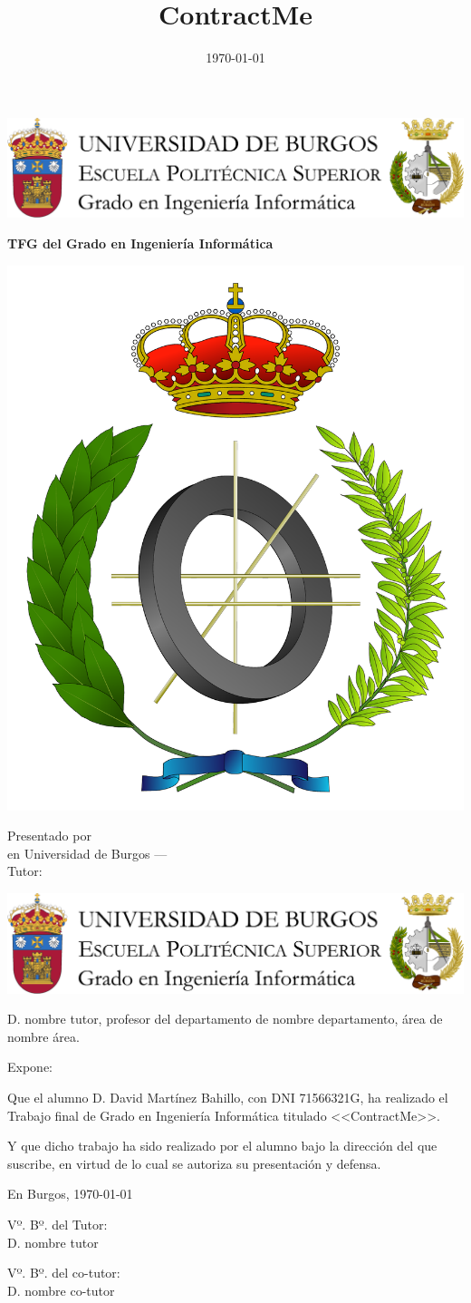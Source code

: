 \documentclass[a4paper,12pt,twoside]{memoir}
\title{ContractMe}
\author{\nombre}
\date{\today}
\makeatletter
\def\maketitle{
  \null
  \thispagestyle{empty}
\noindent\includegraphics[width=\textwidth]{cabecera}\vspace{1cm}%
  \vfill
  \colorbox{cpardoBox}{%
    \begin{minipage}{.8\textwidth}
      \vspace{.5cm}\Large
      \begin{center}
      \textbf{TFG del Grado en Ingeniería Informática}\vspace{.6cm}\\
      \textbf{\LARGE\@title{}}
      \end{center}
      \vspace{.2cm}
    \end{minipage}

  }%
  \hfill\begin{minipage}{.20\textwidth}
    \includegraphics[width=\textwidth]{escudoInfor}
  \end{minipage}
  \vfill
  \begin{center}%
  {%
    \noindent\LARGE
    Presentado por \@author{}\\ 
    en Universidad de Burgos --- \@date{}\\
    Tutor: \@tutor{}\\
  }%
  \end{center}%
  \null
  \cleardoublepage
  }
\newcommand{\nombre}{David Martínez Bahillo} %
\makeatother
\begin{document}
\maketitle


\newpage\null\thispagestyle{empty}\newpage


\thispagestyle{empty}


\noindent\includegraphics[width=\textwidth]{cabecera}\vspace{1cm}

\noindent D. nombre tutor, profesor del departamento de nombre departamento, área de nombre área.

\noindent Expone:

\noindent Que el alumno D. \nombre, con DNI 71566321G, ha realizado el Trabajo final de Grado en Ingeniería Informática titulado <<ContractMe>>. 

\noindent Y que dicho trabajo ha sido realizado por el alumno bajo la dirección del que suscribe, en virtud de lo cual se autoriza su presentación y defensa.

\begin{center} %
En Burgos, {\large \today}
\end{center}

\vfill\vfill\vfill

\begin{minipage}{0.45\textwidth}
\begin{flushleft} %
Vº. Bº. del Tutor:\\[2cm]
D. nombre tutor
\end{flushleft}
\end{minipage}
\hfill
\begin{minipage}{0.45\textwidth}
\begin{flushleft} %
Vº. Bº. del co-tutor:\\[2cm]
D. nombre co-tutor
\end{flushleft}
\end{minipage}
\hfill

\vfill

\end{document}
